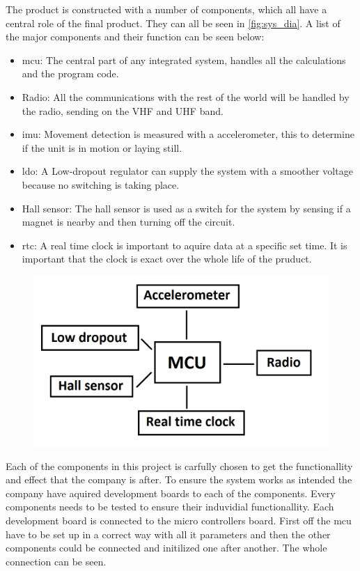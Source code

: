 
The product is constructed with a number of components, which all have a central role of the final product. They can all be seen in \autoref{fig:sys_dia}. A list of the major components and their function can be seen below:

\begin{itemize}[noitemsep] 
\item \gls{mcu}: The central part of any integrated system, handles all the calculations and the program code.
\item Radio: All the communications with the rest of the world will be handled by the radio, sending on the VHF and UHF band.
\item \gls{imu}: Movement detection is measured with a accelerometer, this to determine if the unit is  in motion or laying still. 
\item \gls{ldo}: A Low-dropout regulator can supply the system with a smoother voltage because no switching is taking place.
\item Hall sensor: The hall sensor is used as a switch for the system by sensing if a magnet is nearby and then turning off the circuit.
\item \gls{rtc}: A real time clock is important to aquire data at a specific set time. It is important that the clock is exact over the whole life of the pruduct.
\end{itemize} 


\begin{figure}[H] 
\centering 
\includegraphics[width=.8\linewidth]{Figures/System_diagram} 
\label{fig:sys_dia} 
\end{figure} 

Each of the components in this project is carfully chosen to get the functionallity and effect that the company is after. To ensure the system works as intended the company have aquired development boards to each of the components. Every components needs to be tested to ensure their induvidial functionallity. Each development board is connected to the micro controllers board. First off the \gls{mcu} have to be set up in a correct way with all it parameters and then the other components could be connected and initilized one after another. The whole connection can be seen. %

